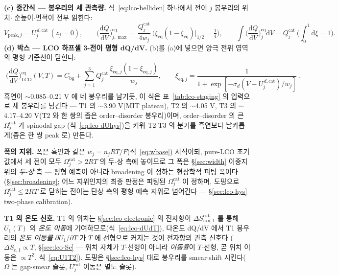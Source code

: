 \documentclass[11pt,a4paper]{article}
\newcommand{\dd}{\mathrm{d}}
\newcommand{\eq}{\mathrm{eq}}
\newcommand{\bg}{\mathrm{bg}}
\newcommand{\rxn}{\mathrm{rxn}}
\begin{document}
\textbf{(c) 중간식 — 봉우리의 세 관측량.} 식~\eqref{eq:lco-belliden} 하나에서 전이 $j$ 봉우리의 위치$\cdot$
순높이$\cdot$면적이 전부 읽힌다:
\begin{equation}
V_{\mathrm{peak},j}=U_j^{\,d,\mathrm{cat}}\ (z_j{=}0),\qquad
\Big(\frac{\dd Q}{\dd V}\Big)^{\eq}_{j,\max}=\frac{Q_j^\mathrm{cat}}{4w_j}\ \Big(\xi_\eq(1{-}\xi_\eq)\big|_{1/2}{=}\tfrac14\Big),\qquad
\int\Big(\frac{\dd Q}{\dd V}\Big)^{\eq}_{j}\dd V=Q_j^\mathrm{cat}\ \Big(\textstyle\int_0^1\dd\xi=1\Big).
\label{eq:lco-peakobs}
\end{equation}
\textbf{(d) 박스 — LCO 하프셀 3-전이 평형 dQ/dV.} (b)를 (a)에 넣으면 양극 전위 영역의 평형 기준선이 닫힌다:
\begin{equation}
\boxed{\;\Big(\frac{\dd Q}{\dd V}\Big)^{\eq}_\mathrm{LCO}(V,T)
=C_\bg+\sum_{j=1}^{3}Q_j^\mathrm{cat}\,
\frac{\xi_{\eq,j}(1-\xi_{\eq,j})}{w_j},
\qquad \xi_{\eq,j}=\frac{1}{1+\exp[-\sigma_d(V-U_j^{\,d,\mathrm{cat}})/w_j]}\;.}
\label{eq:lco-eqpeak}
\end{equation}
흑연이 $\sim$0.085--0.21 V 에 네 봉우리를 남기듯, 이 식은 표~\ref{tab:lco-staging} 의 입력으로 세 봉우리를
남긴다 — T1 의 $\sim$3.90 V(MIT plateau), T2 의 $\sim$4.05 V, T3 의 $\sim$4.17--4.20 V(T2 와 한 쌍의 좁은
order--disorder 봉우리)이며, order--disorder 의 큰 $\Omega_j^\mathrm{cat}$ 가 spinodal gap
(식~\eqref{eq:lco-dUhys})을 키워 T2$\cdot$T3 의 분기를 흑연보다 날카롭게(좁은 한 쌍 peak 로) 만든다.

\textbf{폭의 지위.} 폭은 흑연과 같은 $w_j=n_jRT/F$(식~\eqref{eq:wbase}) 서식이되, pure-LCO 초기값에서 세
전이 모두 $\Omega_j^\mathrm{cat}>2RT$ 의 두-상 측에 놓이므로 그 폭은 \S\ref{sec:width} 이중지위의
\emph{두-상} 측 — 평형 예측이 아니라 broadening 이 정하는 현상학적 피팅 폭이다(\S\ref{sec:broadening};
어느 지위인지의 최종 판정은 피팅된 $\Omega_j^\mathrm{cat}$ 이 정하며, 도핑으로 $\Omega_j^\mathrm{cat}\le2RT$
로 닫히는 전이는 단상 측의 평형 예측 지위로 넘어간다 — \S\ref{sec:lco-hys} two-phase calibration).

\textbf{T1 의 온도 신호.} T1 의 위치는 \S\ref{sec:lco-electronic} 의 전자항이 $\Delta S_{\rxn,1}^\mathrm{cat}$
를 통해 $U_1(T)$ 의 \emph{온도 이동}에 기여하므로(식~\eqref{eq:lco-dUdT}), 다온도 dQ/dV 에서 T1 봉우리의
\emph{온도 이동률} $\partial U_1/\partial T$ 가 $T$ 에 선형으로 커지는 것이 전자항의 관측 신호다
($\Delta S_{e,1}\propto T$, \S\ref{sec:lco-Se} — 위치 자체가 $T$-선형이 아니라 \emph{이동률}이 $T$-선형,
곧 위치 이동은 $\propto T^2$, 식~\eqref{eq:U1T2}). 도핑은 \S\ref{sec:lco-hys} 대로 봉우리를
smear$\cdot$shift 시킨다($\Omega$ 는 gap$\cdot$smear 슬롯, $U_j^\mathrm{cat}$ 이동은 별도 슬롯).
\end{document}
